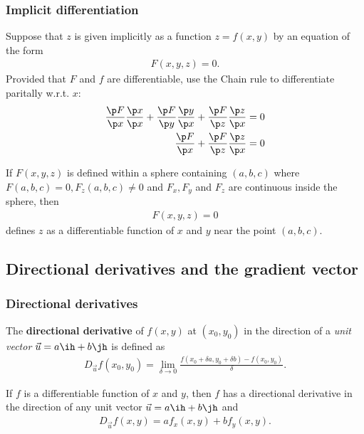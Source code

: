 \documentclass{article}
\begin{document}
\subsubsection{Implicit differentiation}

\begin{definition}
    Suppose that $z$ is given implicitly as a function $z=f(x,y)$ by an
    equation of the form
    \begin{align*}
        F(x,y,z)=0.
    \end{align*}
    Provided that $F$ and $f$ are differentiable, use the Chain rule to
    differentiate paritally w.r.t. $x$:
    \begin{align*}
        \frac{\p F}{\p x}\frac{\p x}{\p x}+\frac{\p F}{\p y}\frac{\p y}{\p x}
        + \frac{\p F}{\p z}\frac{\p z}{\p x}                   & = 0 \\
        \frac{\p F}{\p x} + \frac{\p F}{\p z}\frac{\p z}{\p x} & = 0
    \end{align*}
\end{definition}
\begin{theorem}
    If $F(x,y,z)$ is defined within a sphere containing $(a,b,c)$
    where $F(a,b,c)=0, F_z(a,b,c)\not=0$ and $F_x,F_y$ and $F_z$ are
    continuous inside the sphere, then
    \begin{align*}
        F(x,y,z)=0
    \end{align*}
    defines $z$ as a differentiable function of $x$ and $y$ near the
    point $(a,b,c)$.
\end{theorem}


\subsection{Directional derivatives and the gradient vector}


\subsubsection{Directional derivatives}

\begin{definition}
    The \textbf{directional derivative} of $f(x,y)$ at $(x_0,y_0)$ in the
    direction of a \emph{unit vector} $\vec u=a\ih + b\jh$ is defined as
    \begin{align*}
        D_{\vec u}f(x_0, y_0)=\lim_{\delta \to 0}
        \frac{f(x_0+\delta a, y_0 + \delta b)-f(x_0, y_0)}{\delta}.
    \end{align*}
\end{definition}
\begin{theorem}
    If $f$ is a differentiable function of $x$ and $y$, then $f$
    has a directional derivative in the direction of any unit vector
    $\vec u=a\ih + b\jh$ and
    \begin{align*}
        D_{\vec u}f(x,y) = af_x(x,y) + bf_y(x,y).
    \end{align*}
\end{theorem}
\end{document}
